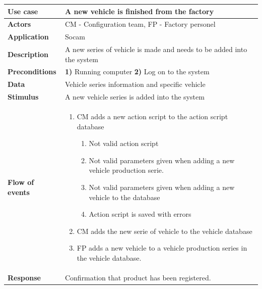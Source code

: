 	\begin{table}[H]
		\centering
		\begin{tabular}{  p{4cm} | p{10cm} }
			\hline
			\rowcolor{gray}
			{\bf Use case} & {\bf A new vehicle is finished from the factory} \\ \hline
			{\bf Actors} & CM - Configuration team, FP - Factory personel \\ \hline
			{\bf Application} & Socam \\ \hline
			{\bf Description} & A new series of vehicle is made and needs to be 
			added into the system \\ \hline
			{\bf Preconditions} & {\bf 1)} Running computer {\bf 2)} Log on to the system \\ \hline
			{\bf Data} & Vehicle series information and specific vehicle \\ \hline
			{\bf Stimulus} & A new vehicle series is added into the system \\ \hline
			{\bf Flow of events} & 
				\begin{enumerate}[font=\bfseries]
					\item CM adds a new action script to the action script database
						\begin{enumerate}[label*=\arabic*., font=\bfseries]
							\item Not valid action script
							\item Not valid parameters given when adding a new vehicle 
							production serie.
							\item Not valid parameters given when adding a new vehicle 
							to the database
							\item Action script is saved with errors
						\end{enumerate}
					\item CM adds the new serie of vehicle to the vehicle database
					\item FP adds a new vehicle to a vehicle production series in the vehicle database. 
				\end{enumerate}
			
			\\ \hline
			{\bf Response} & Confirmation that product has been registered. \\ \hline
		\end{tabular}
	\end{table}